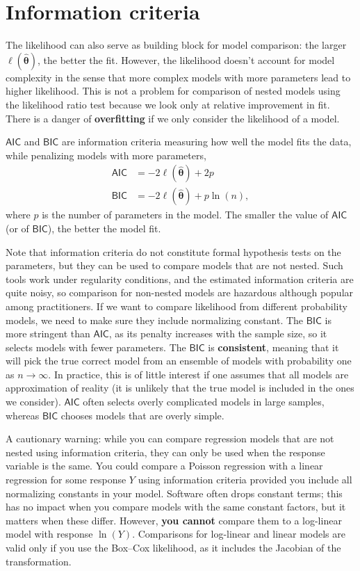 \documentclass[
  11pt,
  letterpaper,
]{scrbook}
\theoremstyle{plain}
\theoremstyle{definition}
\theoremstyle{definition}
\theoremstyle{remark}
\begin{document}
\section{Information criteria}\label{information-criteria}

The likelihood can also serve as building block for model comparison:
the larger \(\ell(\boldsymbol{\widehat{\theta}})\), the better the fit.
However, the likelihood doesn't account for model complexity in the
sense that more complex models with more parameters lead to higher
likelihood. This is not a problem for comparison of nested models using
the likelihood ratio test because we look only at relative improvement
in fit. There is a danger of \textbf{overfitting} if we only consider
the likelihood of a model.

\(\mathsf{AIC}\) and \(\mathsf{BIC}\) are information criteria measuring
how well the model fits the data, while penalizing models with more
parameters, \begin{align*}
\mathsf{AIC}&=-2\ell(\widehat{\boldsymbol{\theta}})+2p \\
\mathsf{BIC}&=-2\ell(\widehat{\boldsymbol{\theta}})+p\ln(n),
\end{align*} where \(p\) is the number of parameters in the model. The
smaller the value of \(\mathsf{AIC}\) (or of \(\mathsf{BIC}\)), the
better the model fit.

Note that information criteria do not constitute formal hypothesis tests
on the parameters, but they can be used to compare models that are not
nested. Such tools work under regularity conditions, and the estimated
information criteria are quite noisy, so comparison for non-nested
models are hazardous although popular among practitioners. If we want to
compare likelihood from different probability models, we need to make
sure they include normalizing constant. The \(\mathsf{BIC}\) is more
stringent than \(\mathsf{AIC}\), as its penalty increases with the
sample size, so it selects models with fewer parameters. The
\(\mathsf{BIC}\) is \textbf{consistent}, meaning that it will pick the
true correct model from an ensemble of models with probability one as
\(n \to \infty\). In practice, this is of little interest if one assumes
that all models are approximation of reality (it is unlikely that the
true model is included in the ones we consider). \(\mathsf{AIC}\) often
selects overly complicated models in large samples, whereas
\(\mathsf{BIC}\) chooses models that are overly simple.

A cautionary warning: while you can compare regression models that are
not nested using information criteria, they can only be used when the
response variable is the same. You could compare a Poisson regression
with a linear regression for some response \(Y\) using information
criteria provided you include all normalizing constants in your model.
Software often drops constant terms; this has no impact when you compare
models with the same constant factors, but it matters when these differ.
However, \textbf{you cannot} compare them to a log-linear model with
response \(\ln(Y)\). Comparisons for log-linear and linear models are
valid only if you use the Box--Cox likelihood, as it includes the
Jacobian of the transformation.
\end{document}
